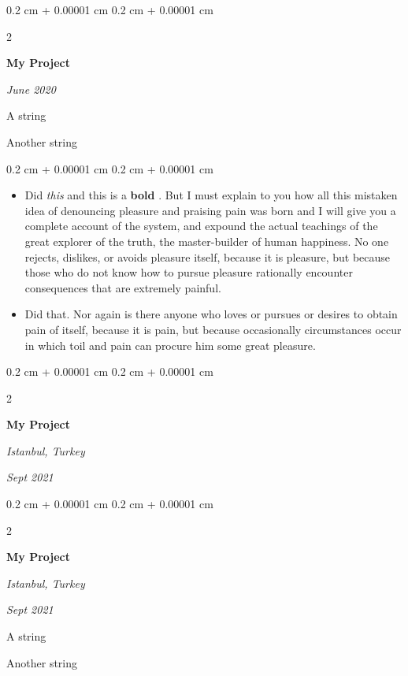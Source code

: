 \documentclass[10pt, letterpaper]{article}
\newenvironment{summary}{
    \begin{description}[
        topsep=0.10 cm,
        parsep=0.10 cm,
        partopsep=0pt,
        itemsep=0pt,
        leftmargin=0.4 cm + 10pt
    ]
}{
    \end{description}
} %
\newenvironment{highlights}{
    \begin{itemize}[
        topsep=0.10 cm,
        parsep=0.10 cm,
        partopsep=0pt,
        itemsep=0pt,
        leftmargin=0.4 cm + 10pt
    ]
}{
    \end{itemize}
} %
\newenvironment{onecolentry}{
    \begin{adjustwidth}{
        0.2 cm + 0.00001 cm
    }{
        0.2 cm + 0.00001 cm
    }
}{
    \end{adjustwidth}
} %
\newenvironment{twocolentry}[2][]{
    \onecolentry
    \def\secondColumn{#2}
    \setcolumnwidth{\fill, 4.5 cm}
    \begin{paracol}{2}
}{
    \switchcolumn \raggedleft \secondColumn
    \end{paracol}
    \endonecolentry
} %
\let\hrefWithoutArrow\href
\renewcommand{\href}[2]{\hrefWithoutArrow{#1}{\ifthenelse{\equal{#2}{}}{ }{#2 }\raisebox{.15ex}{\footnotesize \faExternalLink*}}}
\begin{document}
        \begin{twocolentry}{
            
            
        \textit{June 2020}}
            \textbf{My Project}
        \end{twocolentry}
            \begin{summary}
                \item A string
                \item Another string
            \end{summary}
        \vspace{0.10 cm}
        \begin{onecolentry}
            \begin{highlights}
                \item Did \textit{this} and this is a \textbf{bold} \href{https://example.com}{link}. But I must explain to you how all this mistaken idea of denouncing pleasure and praising pain was born and I will give you a complete account of the system, and expound the actual teachings of the great explorer of the truth, the master-builder of human happiness. No one rejects, dislikes, or avoids pleasure itself, because it is pleasure, but because those who do not know how to pursue pleasure rationally encounter consequences that are extremely painful.
                \item Did that. Nor again is there anyone who loves or pursues or desires to obtain pain of itself, because it is pain, but because occasionally circumstances occur in which toil and pain can procure him some great pleasure.
            \end{highlights}
        \end{onecolentry}


        \vspace{0.2 cm}

        \begin{twocolentry}{
        \textit{Istanbul, Turkey}    
            
        \textit{Sept 2021}}
            \textbf{My Project}
        \end{twocolentry}


        \vspace{0.2 cm}

        \begin{twocolentry}{
        \textit{Istanbul, Turkey}    
            
        \textit{Sept 2021}}
            \textbf{My Project}
        \end{twocolentry}
            \begin{summary}
                \item A string
                \item Another string
            \end{summary}
\end{document}
